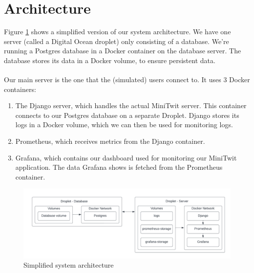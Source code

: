 \newpage
\section*{Architecture}

Figure \ref{fig:system-arch} shows a simplified version of our system architecture. We have one server (called a Digital Ocean droplet) only consisting of a database. We're running a Postgres database in a Docker container on the database server. The database stores its data in a Docker volume, to ensure persistent data.
\\\\
Our main server is the one that the (simulated) users connect to. It uses 3 Docker containers:
\begin{enumerate}
    \item The Django server, which handles the actual MiniTwit server. This container connects to our Postgres database on a separate Droplet. Django stores its logs in a Docker volume, which we can then be used for monitoring logs.
    
    \item Prometheus, which receives metrics from the Django container.

    \item Grafana, which contains our dashboard used for monitoring our MiniTwit application. The data Grafana shows is fetched from the Prometheus container.
\end{enumerate}

\begin{figure}[ht]
    \centering
    \includegraphics[width=\textwidth]{images/system-architechture.png}
    \caption{Simplified system architecture}
    \label{fig:system-arch}
\end{figure}